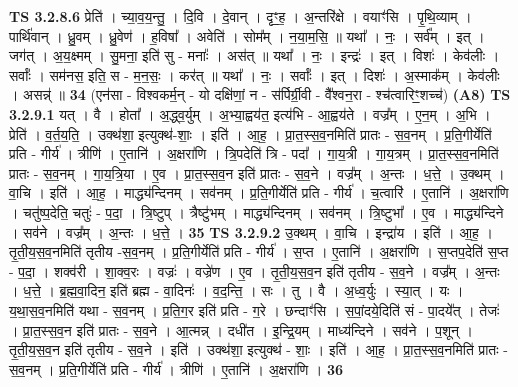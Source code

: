 \documentclass[17pt]{extarticle}
\begin{document}
                  \newline
                                \textbf{ TS 3.2.8.6} \newline
                  प्रेति॑ । च्या॒व॒य॒न्तु॒ । दि॒वि । दे॒वान् । दृꣳ॒॒ह॒ । अ॒न्तरि॑क्षे । वयाꣳ॑सि । पृ॒थि॒व्याम् । पार्थि॑वान् । ध्रु॒वम् । ध्रु॒वेण॑ । ह॒विषा᳚ । अवेति॑ । सोम᳚म् । न॒या॒म॒सि॒ ॥ यथा᳚ । नः॒ । सर्व᳚म् । इत् । जग॑त् । अ॒य॒क्ष्मम् । सु॒मना॒ इति॑ सु - मनाः᳚ । अस॑त् ॥ यथा᳚ । नः॒ । इन्द्रः॑ । इत् । विशः॑ । केव॑लीः । सर्वाः᳚ । सम॑नस॒ इति॒ स - म॒न॒सः॒ । कर॑त् ॥ यथा᳚ । नः॒ । सर्वाः᳚ । इत् । दिशः॑ । अ॒स्माक᳚म् । केव॑लीः । असन्न्॑ ॥ \textbf{  34} \newline
                  \newline
                      (एन॑सा - विश्वकर्म॒न् - यो दक्षि॑णां॒ न - स॑र्पिर्ग्री॒वी - वै᳚श्वन॒रा - श्च॑त्वारिꣳ॒॒शच्च॑)  \textbf{(A8)} \newline \newline
                                \textbf{ TS 3.2.9.1} \newline
                  यत् । वै । होता᳚ । अ॒द्ध्व॒र्युम् । अ॒भ्या॒ह्वय॑त॒ इत्य॑भि - आ॒ह्वय॑ते । वज्र᳚म् । ए॒न॒म् । अ॒भि । प्रेति॑ । व॒र्त॒य॒ति॒ । उक्थ॑शा॒ इत्युक्थ॑-शाः॒ । इति॑ । आ॒ह॒ । प्रा॒त॒स्स॒व॒नमिति॑ प्रातः - स॒व॒नम् । प्र॒ति॒गीर्येति॑ प्रति - गीर्य॑ । त्रीणि॑ । ए॒तानि॑ । अ॒क्षरा॑णि । त्रि॒पदेति॑ त्रि - पदा᳚ । गा॒य॒त्री । गा॒य॒त्रम् । प्रा॒त॒स्स॒व॒नमिति॑ प्रातः - स॒व॒नम् । गा॒य॒त्रि॒या । ए॒व । प्रा॒त॒स्स॒व॒न इति॑ प्रातः - स॒व॒ने । वज्र᳚म् । अ॒न्तः । ध॒त्ते॒ । उ॒क्थम् । वा॒चि । इति॑ । आ॒ह॒ । माद्ध्य॑न्दिनम् । सव॑नम् । प्र॒ति॒गीर्येति॑ प्रति - गीर्य॑ । च॒त्वारि॑ । ए॒तानि॑ । अ॒क्षरा॑णि । चतु॑ष्प॒देति॒ चतुः॑ - प॒दा॒ । त्रि॒ष्टुप् । त्रैष्टु॑भम् । माद्ध्य॑न्दिनम् । सव॑नम् । त्रि॒ष्टुभा᳚ । ए॒व । माद्ध्य॑न्दिने । सव॑ने । वज्र᳚म् । अ॒न्तः । ध॒त्ते॒ । \textbf{  35} \newline
                  \newline
                                \textbf{ TS 3.2.9.2} \newline
                  उ॒क्थम् । वा॒चि । इन्द्रा॑य । इति॑ । आ॒ह॒ । तृ॒ती॒य॒स॒व॒नमिति॑ तृतीय -स॒व॒नम् । प्र॒ति॒गीर्येति॑ प्रति - गीर्य॑ । स॒प्त । ए॒तानि॑ । अ॒क्षरा॑णि । स॒प्तप॒देति॑ स॒प्त - प॒दा॒ । शक्व॑री । शा॒क्व॒रः । वज्रः॑ । वज्रे॑ण । ए॒व । तृ॒ती॒य॒स॒व॒न इति॑ तृतीय - स॒व॒ने । वज्र᳚म् । अ॒न्तः । ध॒त्ते॒ । ब्र॒ह्म॒वा॒दिन॒ इति॑ ब्रह्म - वा॒दिनः॑ । व॒द॒न्ति॒ । सः । तु । वै । अ॒ध्व॒र्युः । स्या॒त् । यः । य॒था॒स॒व॒नमिति॑ यथा - स॒व॒नम् । प्र॒ति॒ग॒र इति॑ प्रति - ग॒रे । छन्दाꣳ॑सि । स॒पां॒दये॒दिति॑ सं - पा॒दये᳚त् । तेजः॑ । प्रा॒त॒स्स॒व॒न इति॑ प्रातः - स॒व॒ने । आ॒त्मन्न् । दधी॑त । इ॒न्द्रि॒यम् । माध्य॑न्दिने । सव॑ने । प॒शून् । तृ॒ती॒य॒स॒व॒न इति॑ तृतीय - स॒व॒ने । इति॑ । उक्थ॑शा॒ इत्युक्थ॑ - शाः॒ । इति॑ । आ॒ह॒ । प्रा॒त॒स्स॒व॒नमिति॑ प्रातः - स॒व॒नम् । प्र॒ति॒गीर्येति॑ प्रति - गीर्य॑ । त्रीणि॑ । ए॒तानि॑ । अ॒क्षरा॑णि । \textbf{  36} \newline
\end{document}
